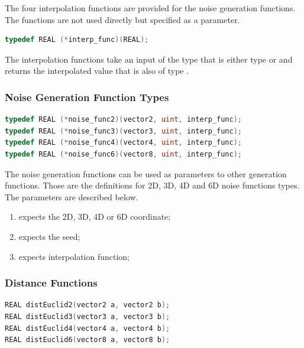 The four interpolation functions are provided for the noise generation functions.
The functions are not used directly but specified as a parameter.

\begin{lstlisting}[caption={Definition of interpolation function type},label={lst:interpolation_definition_type},language=OpenCL]
typedef REAL (*interp_func)(REAL);
\end{lstlisting}

The interpolation functions take an input of the type  that
is either type  or  and returns the interpolated value
that is also of type .

\subsubsection{Noise Generation Function Types}

\begin{lstlisting}[caption={Definition of noise generation function types},label={lst:noise_functions_types},language=OpenCL]
typedef REAL (*noise_func2)(vector2, uint, interp_func);
typedef REAL (*noise_func3)(vector3, uint, interp_func);
typedef REAL (*noise_func4)(vector4, uint, interp_func);
typedef REAL (*noise_func6)(vector8, uint, interp_func);
\end{lstlisting}

The noise generation functions can be used as parameters to other generation
functions. Those are the definitions for 2D, 3D, 4D and 6D noise functions types.
The parameters are described below.

\begin{enumerate}
\item expects the 2D, 3D, 4D or 6D coordinate;
\item expects the seed;
\item expects interpolation function;
\end{enumerate}

\subsubsection{Distance Functions}

\begin{lstlisting}[caption={Definition of Euclid distance functions},label={lst:distance_euclid_functions},language=OpenCL]
REAL distEuclid2(vector2 a, vector2 b);
REAL distEuclid3(vector3 a, vector3 b);
REAL distEuclid4(vector4 a, vector4 b);
REAL distEuclid6(vector8 a, vector8 b);
\end{lstlisting}

